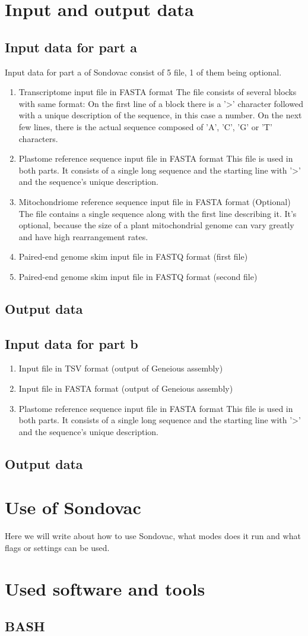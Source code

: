 \section{Input and output data}

\subsection{Input data for part a}
Input data for part a of Sondovac consist of 5 file, 1 of them being optional. 
\begin{enumerate}
\item Transcriptome input file in FASTA format
The file consists of several blocks with same format: On the first line of a block there is a '>' character followed 
with a unique description of the sequence, in this case a number. On the next few lines, there is the actual sequence 
composed of 'A', 'C', 'G' or 'T' characters. 
\item Plastome reference sequence input file in FASTA format
This file is used in both parts. It consists of a single long sequence and the starting line with '>' and the sequence's 
unique description. 
\item Mitochondriome reference sequence input file in FASTA format (Optional)
The file contains a single sequence along with the first line describing it. It's optional, because the size of a plant
mitochondrial genome can vary greatly and have high rearrangement rates. 
\item Paired-end genome skim input file in FASTQ format (first file)
\item Paired-end genome skim input file in FASTQ format (second file)
\end{enumerate}
\subsection{Output data}

\subsection{Input data for part b}
\begin{enumerate}
\item Input file in TSV format (output of Geneious assembly)
\item Input file in FASTA format (output of Geneious assembly)
\item Plastome reference sequence input file in FASTA format
This file is used in both parts. It consists of a single long sequence and the starting line with '>' and the sequence's 
unique description. 
\end{enumerate}
\subsection{Output data}

\section{Use of Sondovac}
Here we will write about how to use Sondovac, what modes does it run and what flags or settings can be used. 
\section{Used software and tools}

\subsection{BASH}
